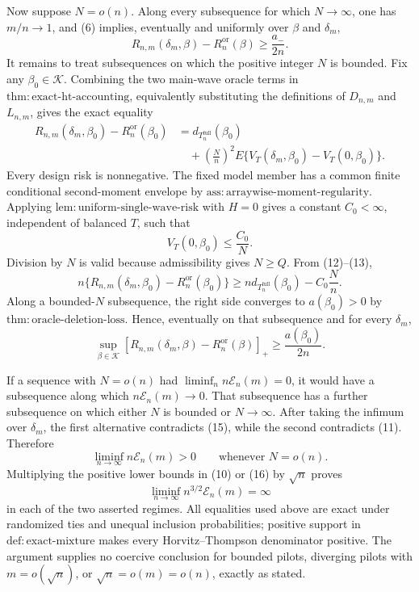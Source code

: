 Now suppose \(N=o(n)\).  Along every subsequence for which \(N\to\infty\), one has \(m/n\to1\), and (6) implies, eventually and uniformly over \(\beta\) and \(\delta_m\),
\[
R_{n,m}(\delta_m,\beta)-R_n^{\mathrm{or}}(\beta)
\geq\frac{a_-}{2n}.
\tag{11}
\]
It remains to treat subsequences on which the positive integer \(N\) is bounded.  Fix any \(\beta_0\in\mathcal K\).  Combining the two main-wave oracle terms in \(\mathrm{thm{:}exact\text{-}ht\text{-}accounting}\), equivalently substituting the definitions of \(D_{n,m}\) and \(L_{n,m}\), gives the exact equality
\[
\begin{aligned}
R_{n,m}(\delta_m,\beta_0)-R_n^{\mathrm{or}}(\beta_0)
&=d_{T_n^{\mathrm{full}}}(\beta_0)\\
&\quad+\left(\frac Nn\right)^2
E\{V_T(\delta_m,\beta_0)-V_T(0,\beta_0)\}.
\end{aligned}
\tag{12}
\]
Every design risk is nonnegative.  The fixed model member has a common finite conditional second-moment envelope by \(\mathrm{ass{:}arraywise\text{-}moment\text{-}regularity}\).  Applying \(\mathrm{lem{:}uniform\text{-}single\text{-}wave\text{-}risk}\) with \(H=0\) gives a constant \(C_0<\infty\), independent of balanced \(T\), such that
\[
V_T(0,\beta_0)\leq\frac{C_0}{N}.
\tag{13}
\]
Division by \(N\) is valid because admissibility gives \(N\geq Q\).  From (12)--(13),
\[
n\{R_{n,m}(\delta_m,\beta_0)-R_n^{\mathrm{or}}(\beta_0)\}
\geq n d_{T_n^{\mathrm{full}}}(\beta_0)-C_0\frac Nn.
\tag{14}
\]
Along a bounded-\(N\) subsequence, the right side converges to \(a(\beta_0)>0\) by \(\mathrm{thm{:}oracle\text{-}deletion\text{-}loss}\).  Hence, eventually on that subsequence and for every \(\delta_m\),
\[
\sup_{\beta\in\mathcal K}
[R_{n,m}(\delta_m,\beta)-R_n^{\mathrm{or}}(\beta)]_+
\geq\frac{a(\beta_0)}{2n}.
\tag{15}
\]

If a sequence with \(N=o(n)\) had \(\liminf_n n\mathcal E_n(m)=0\), it would have a subsequence along which \(n\mathcal E_n(m)\to0\).  That subsequence has a further subsequence on which either \(N\) is bounded or \(N\to\infty\).  After taking the infimum over \(\delta_m\), the first alternative contradicts (15), while the second contradicts (11).  Therefore
\[
\liminf_{n\to\infty}n\mathcal E_n(m)>0
\qquad\text{whenever }N=o(n).
\tag{16}
\]
Multiplying the positive lower bounds in (10) or (16) by \(\sqrt n\) proves
\[
\liminf_{n\to\infty}n^{3/2}\mathcal E_n(m)=\infty
\tag{17}
\]
in each of the two asserted regimes.  All equalities used above are exact under randomized ties and unequal inclusion probabilities; positive support in \(\mathrm{def{:}exact\text{-}mixture}\) makes every Horvitz--Thompson denominator positive.  The argument supplies no coercive conclusion for bounded pilots, diverging pilots with \(m=o(\sqrt n)\), or \(\sqrt n=o(m)=o(n)\), exactly as stated.
